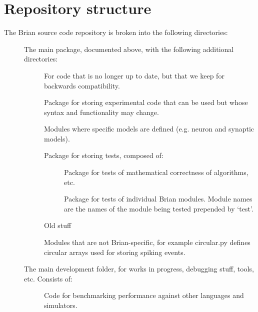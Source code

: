 \documentclass[letterpaper,10pt,english]{manual}
\begin{document}
\resetcurrentobjects
\hypertarget{--doc-developer-repositorystructure}{}

\section{Repository structure}

The Brian source code repository is broken into the following directories:
\begin{description}
\item[]
The main package, documented above, with the following additional directories:
\begin{description}
\item[]
For code that is no longer up to date, but that we keep for backwards
compatibility.

\item[]
Package for storing experimental code that can be used but whose
syntax and functionality may change.

\item[]
Modules where specific models are defined (e.g. neuron and synaptic models).

\item[]
Package for storing tests, composed of:
\begin{description}
\item[]
Package for tests of mathematical correctness of algorithms, etc.

\item[]
Package for tests of individual Brian modules. Module names are
the names of the module being tested prepended by `test'.

\end{description}

\item[]
Old stuff

\item[]
Modules that are not Brian-specific, for example circular.py defines
circular arrays used for storing spiking events.

\end{description}

\item[]
The main development folder, for works in progress, debugging stuff, tools,
etc. Consists of:
\begin{description}
\item[]
Code for benchmarking performance against other languages and
simulators.


\end{description}
\end{description}
\end{document}
